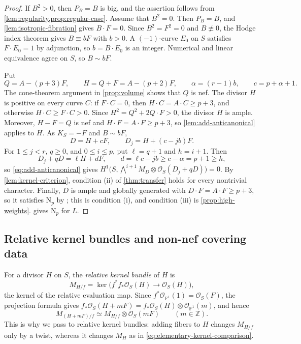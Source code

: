 \documentclass[11pt,reqno]{amsart}
\numberwithin{equation}{section}
\theoremstyle{remark}
\newcommand{\sshf}[1]{\mathcal{O}_{#1}}
\newcommand{\prj}[1]{\mathbb{P}^{#1}}
\newcommand{\NP}{\mathrm N}
\begin{document}
\begin{proof}
If \(B^2>0\), then \(P_B=B\) is big, and the assertion follows from \cref{lem:regularity,prop:regular-case}. Assume that \(B^2=0\). Then \(P_B=B\), and \cref{lem:isotropic-fibration} gives \(B\cdot F=0\). Since \(B^2=F^2=0\) and \(B\not\equiv0\), the Hodge index theorem gives \(B\equiv bF\) with \(b>0\). A \((-1)\)-curve \(E_0\) on \(S\) satisfies \(F\cdot E_0=1\) by adjunction, so \(b=B\cdot E_0\) is an integer. Numerical and linear equivalence agree on \(S\), so \(B\sim bF\).

Put
\[
 Q=A-(p+3)F,\qquad H=Q+F=A-(p+2)F,\qquad
 \alpha=(r-1)b,\qquad c=p+\alpha+1.
\]
The cone-theorem argument in \cref{prop:volume} shows that \(Q\) is nef. The divisor \(H\) is positive on every curve \(C\): if \(F\cdot C=0\), then \(H\cdot C=A\cdot C\geq p+3\), and otherwise \(H\cdot C\geq F\cdot C>0\). Since \(H^2=Q^2+2Q\cdot F>0\), the divisor \(H\) is ample. Moreover, \(H-F=Q\) is nef and \(H\cdot F=A\cdot F\geq p+3\), so \cref{lem:add-anticanonical} applies to \(H\). As \(K_S=-F\) and \(B\sim bF\),
\[
 D=H+cF,\qquad D_j=H+(c-jb)F.
\]
For \(1\leq j<r\), \(q\geq0\), and \(0\leq i\leq p\), put \(\ell=q+1\) and \(h=i+1\). Then
\[
 D_j+qD=\ell H+dF,\qquad
 d=\ell c-jb\geq c-\alpha=p+1\geq h,
\]
so \eqref{eq:add-anticanonical} gives \(H^1\bigl(S,\bigwedge^{i+1}M_D\otimes\sshf{S}(D_j+qD)\bigr)=0\). By \cref{lem:kernel-criterion}, condition \textup{(ii)} of \cref{thm:transfer} holds for every nontrivial character. Finally, \(D\) is ample and globally generated with \(D\cdot F=A\cdot F\geq p+3\), so it satisfies \(\NP_p\) by \cite[Theorem 1.3]{GP01}; this is condition \textup{(i)}, and condition \textup{(iii)} is \cref{prop:high-weights}.  gives \(\NP_p\) for \(L\).
\end{proof}

\subsection{Relative kernel bundles and non-nef covering data}\label{sec:relative}

For a divisor \(H\) on \(S\), the \emph{relative kernel bundle} of \(H\) is
\[
 M_{H/f}=\ker\bigl(f^*f_*\sshf{S}(H)\longrightarrow\sshf{S}(H)\bigr),
\]
the kernel of the relative evaluation map. Since \(f^*\sshf{\prj{1}}(1)=\sshf{S}(F)\), the projection formula gives \(f_*\sshf{S}(H+mF)=f_*\sshf{S}(H)\otimes\sshf{\prj{1}}(m)\), and hence
\begin{equation}\label{eq:relative-twist}
 M_{(H+mF)/f}\simeq M_{H/f}\otimes\sshf{S}(mF)\qquad(m\in\mathbb Z).
\end{equation}
This is why we pass to relative kernel bundles: adding fibers to \(H\) changes \(M_{H/f}\) only by a twist, whereas it changes \(M_H\) as in \eqref{eq:elementary-kernel-comparison}.
\end{document}

